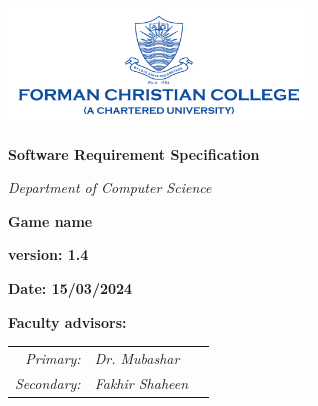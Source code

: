
\begin{titlepage}
    \centering
    \vspace*{0.5cm}
    \includegraphics[width=0.6\textwidth]{./images/fcc_logo} %
    \vspace{2.5cm}

    {\LARGE\bfseries Software Requirement Specification\par}
    \vspace{0.5cm}
    {\Large\itshape Department of Computer Science\par}
    \vspace{2.5cm}
    {\ProjectTitle\bfseries Game name\par}
    \vspace{3.5cm}
    {\large\bfseries version: 1.4\par}
    \vspace{0.5cm}
    {\large\bfseries Date: 15/03/2024\par}
    
    \newpage
    
    \vspace*{\fill}

    \begin{center}
        {\Large\bfseries Faculty advisors:\par}

        \vspace{1em} %
        
        \begin{center}
        \begin{tabular}{r l c}
            \textit{Primary:} & \textit{Dr. Mubashar} & \raisebox{-1.0ex}{\rule{4cm}{.4pt}} \\[1cm]
            \textit{Secondary:} & \textit{Fakhir Shaheen} & \raisebox{-1.0ex}{\rule{4cm}{.4pt}} \\
        \end{tabular}
        \end{center}
    
        \vspace{3cm}
    

\end{center}
\end{titlepage}
